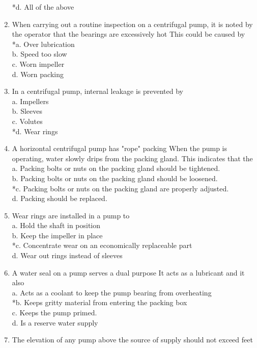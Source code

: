 \begin{enumerate}[1.]
*d. All of the above\\
\item When carrying out a routine inspection on a centrifugal pump, it is noted by the operator that the bearings are excessively hot This could be caused by\\
*a. Over lubrication\\
b. Speed too slow\\
c. Worn impeller\\
d. Worn packing\\
\item In a centrifugal pump, internal leakage is prevented by\\
a. Impellers\\
b. Sleeves\\
c. Volutes\\
*d. Wear rings\\
\item A horizontal centrifugal pump has "rope" packing When the pump is operating, water slowly drips from the packing gland. This indicates that the\\
a. Packing bolts or nuts on the packing gland should be tightened.\\
b. Packing bolts or nuts on the packing gland should be loosened.\\
*c. Packing bolts or nuts on the packing gland are properly adjusted.\\
d. Packing should be replaced.\\
\item Wear rings are installed in a pump to\\
a. Hold the shaft in position\\
b. Keep the impeller in place\\
*c. Concentrate wear on an economically replaceable part\\
d. Wear out rings instead of sleeves\\
\item A water seal on a pump serves a dual purpose It acts as a lubricant and it also\\
a. Acts as a coolant to keep the pump bearing from overheating\\
*b. Keeps gritty material from entering the packing box\\
c. Keeps the pump primed.\\
d. Is a reserve water supply\\
\item The elevation of any pump above the source of supply should not exceed feet\\

\end{enumerate}
